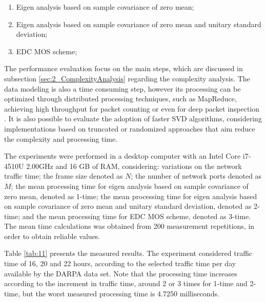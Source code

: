 \begin{enumerate}
	\item Eigen analysis based on sample covariance of zero mean;
	\item Eigen analysis based on sample covariance of zero mean and unitary standard deviation;
	\item EDC MOS scheme;
\end{enumerate}

The performance evaluation focus on the main steps, which are discussed in subsection \ref{sec:2_ComplexityAnalysis} regarding the complexity analysis. The data modeling is also a time consuming step, however its processing can be optimized through distributed processing techniques, such as MapReduce, achieving high throughput for packet counting or even for deep packet inspection \cite{vieira2012measuring, vieira2012evaluating, vieira2013evaluating, vieira2013approach}. It is also possible to evaluate the adoption of faster SVD algorithms, considering implementations based on truncated or randomized approaches \cite{halko2011finding} that aim reduce the complexity and processing time.

The experiments were performed in a desktop computer with an Intel Core i7-4510U 2.00GHz and 16 GB of RAM, considering: variations on the network traffic time; the frame size denoted as $N$; the number of network ports denoted as $M$; the mean processing time for eigen analysis based on sample covariance of zero mean, denoted as 1-time; the mean processing time for eigen analysis based on sample covariance of zero mean and unitary standard deviation, denoted as 2-time; and the mean processing time for EDC MOS scheme, denoted as 3-time. The mean time calculations was obtained from 200 measurement repetitions, in order to obtain reliable values.

Table \ref{tab:11} presents the measured results. The experiment considered traffic time of 16, 20 and 22 hours, according to the selected traffic time per day available by the DARPA data set. Note that the processing time increases according to the increment in traffic time, around 2 or 3 times for 1-time and 2-time, but the worst measured processing time is 4.7250 milliseconds.

